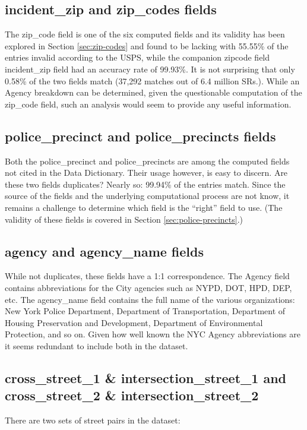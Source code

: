 \documentclass[12pt, titlepage]{article}
\begin{document}
 \subsection{incident\_zip and zip\_codes fields}
 The zip\_code field is one of the six computed fields and its validity has been explored in Section \ref{sec:zip-codes} and
 found to be lacking with 55.55\% of the entries invalid according to the USPS, while the companion zipcode
 field incident\_zip field had an accuracy rate of 99.93\%. It is not surprising that 
 only 0.58\% of the two fields match (37,292 matches out of 6.4 million SRs.). While an Agency breakdown can be
 determined, given the questionable computation of the zip\_code field, such an analysis would
 seem to provide any useful information.  

 \subsection{police\_precinct and police\_precincts fields}  
Both the police\_precinct and police\_precincts are among the computed fields not cited in the Data Dictionary. Their usage however, is easy to discern. Are these two fields duplicates? Nearly so:  99.94\% of the entries match. Since the source of the fields and the underlying computational process are not know, it remains a challenge to determine which field is
the ``right'' field to use. (The validity of these fields is covered in Section \ref{sec:police-precincts}.)

 \subsection{agency and agency\_name fields}
 While not duplicates, these fields have a 1:1 correspondence.  The Agency field contains abbreviations for the City agencies such as NYPD, DOT, HPD, DEP, etc.
 The agency\_name field contains the full name of the various organizations: New York Police Department, Department of Transportation, Department
 of Housing Preservation and Development, Department of Environmental Protection, and so on.  Given how well known the NYC Agency abbreviations are
it seems redundant to include both in the dataset.

\subsection{cross\_street\_1 \& intersection\_street\_1 and cross\_street\_2 \& intersection\_street\_2}
There are two sets of street pairs in the dataset:
\end{document}

